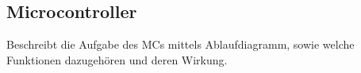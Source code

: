\subsection{Microcontroller}\label{sec:microcontrollerSoftware}

Beschreibt die Aufgabe des MCs mittels Ablaufdiagramm, sowie welche Funktionen dazugehören und deren Wirkung.